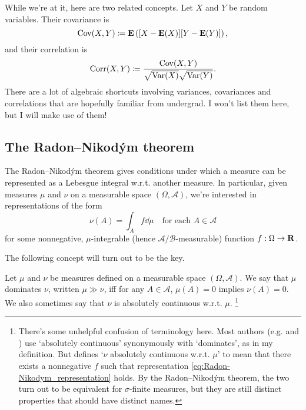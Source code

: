 \documentclass[11pt,letterpaper,reqno,oneside]{article}
\begin{document}
While we're at it, here are two related concepts. Let $X$ and $Y$ be random variables. Their covariance is
%
\begin{equation*}
	\mathrm{Cov}(X,Y) \coloneqq \mathbf{E}\left( [X-\mathbf{E}(X)] [Y-\mathbf{E}(Y)] \right) ,
\end{equation*}
%
and their correlation is
%
\begin{equation*}
	\mathrm{Corr}(X,Y) \coloneqq \frac{ \mathrm{Cov}(X,Y) }{ \sqrt{\mathrm{Var}(X)} \sqrt{\mathrm{Var}(Y)} } .
\end{equation*}
%
There are a lot of algebraic shortcuts involving variances, covariances and correlations that are hopefully familiar from undergrad. I won't list them here, but I will make use of them!



\subsection{The Radon--Nikod\'{y}m theorem}
\label{sec:probability:Radon-Nikodym}

The Radon--Nikod\'{y}m theorem gives conditions under which a measure can be represented as a Lebesgue integral w.r.t. another measure. In particular, given measures $\mu$ and $\nu$ on a measurable space $(\Omega,\mathcal{A})$, we're interested in representations of the form
%
\begin{equation}
	\nu(A) = \int_A f \dd \mu \quad\text{for each $A \in \mathcal{A}$}
	\label{eq:Radon-Nikodym_representation}
\end{equation}
%
for some nonnegative, $\mu$-integrable (hence $\mathcal{A}/\mathcal{B}$-measurable) function $f : \Omega \to \mathbf{R}$.

The following concept will turn out to be the key.
%
\begin{definition}
	Let $\mu$ and $\nu$ be measures defined on a measurable space $(\Omega,\mathcal{A})$. We say that $\mu$ dominates $\nu$, written $\mu \gg \nu$, iff for any $A \in \mathcal{A}$, $\mu(A)=0$ implies $\nu(A)=0$. We also sometimes say that $\nu$ is absolutely continuous w.r.t. $\mu$.%
		\footnote{There's some unhelpful confusion of terminology here. Most authors (e.g. \textcite{KolmogorovFomin1975} and \textcite{Billingsley1995}) use `absolutely continuous' synonymously with `dominates', as in my definition. But \textcite[][p. 143]{Rosenthal2006} defines `$\nu$ absolutely continuous w.r.t. $\mu$' to mean that there exists a nonnegative $f$ such that representation \eqref{eq:Radon-Nikodym_representation} holds. By the Radon--Nikod\'{y}m theorem, the two turn out to be equivalent for $\sigma$-finite measures, but they are still distinct properties that should have distinct names.}
\end{definition}
\end{document}
